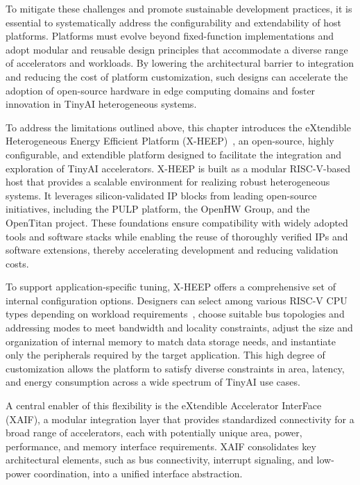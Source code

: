         To mitigate these challenges and promote sustainable development practices, it is essential to systematically address the configurability and extendability of host platforms. Platforms must evolve beyond fixed-function implementations and adopt modular and reusable design principles that accommodate a diverse range of accelerators and workloads. By lowering the architectural barrier to integration and reducing the cost of platform customization, such designs can accelerate the adoption of open-source hardware in edge computing domains and foster innovation in TinyAI heterogeneous systems.

        To address the limitations outlined above, this chapter introduces the eXtendible Heterogeneous Energy Efficient Platform (\mbox{X-HEEP})~\cite{x-heep, x-heep_1, x-heep_2}, an open-source, highly configurable, and extendible platform designed to facilitate the integration and exploration of TinyAI accelerators. \mbox{X-HEEP} is built as a modular RISC-V-based host that provides a scalable environment for realizing robust heterogeneous systems. It leverages silicon-validated IP blocks from leading open-source initiatives, including the PULP platform, the OpenHW Group, and the OpenTitan project. These foundations ensure compatibility with widely adopted tools and software stacks while enabling the reuse of thoroughly verified IPs and software extensions, thereby accelerating development and reducing validation costs.
        
        To support application-specific tuning, \mbox{X-HEEP} offers a comprehensive set of internal configuration options. Designers can select among various RISC-V CPU types depending on workload requirements~\cite{zeroriscy}, choose suitable bus topologies and addressing modes to meet bandwidth and locality constraints, adjust the size and organization of internal memory to match data storage needs, and instantiate only the peripherals required by the target application. This high degree of customization allows the platform to satisfy diverse constraints in area, latency, and energy consumption across a wide spectrum of TinyAI use cases.
        
        A central enabler of this flexibility is the eXtendible Accelerator InterFace (XAIF), a modular integration layer that provides standardized connectivity for a broad range of accelerators, each with potentially unique area, power, performance, and memory interface requirements. XAIF consolidates key architectural elements, such as bus connectivity, interrupt signaling, and low-power coordination, into a unified interface abstraction.
        
